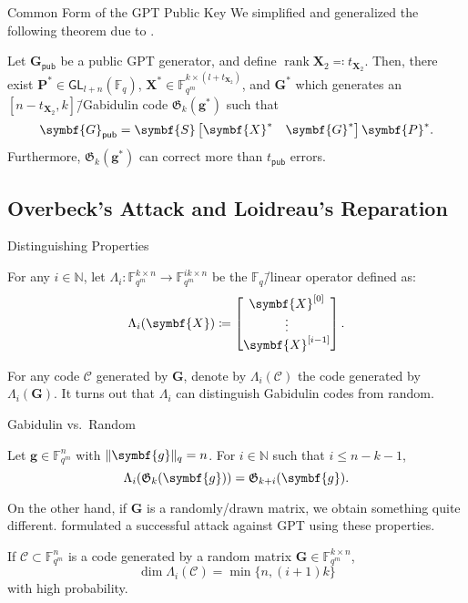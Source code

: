 \documentclass[usepdftitle=false]{beamer}
\renewcommand*{\vec}{\symbf}%
\newcommand*{\mat}{\symbf}%
\DeclareMathOperator{\rank}{rank}%
\newcommand*{\GL}{\ensuremath{\mathsf{GL}}}%
\newcommand*{\pub}{\ensuremath{\mathsf{pub}}}%
\newcommand*{\FF}{\ensuremath{\mathbb{F}}}%
\newcommand*{\NN}{\ensuremath{\mathbb{N}}}%
\newcommand*{\Gab}{\ensuremath{\mathfrak{G}}}%
\DeclarePairedDelimiter{\norm}{\lVert}{\rVert}%
\newcommand*{\normR}[2]{\ensuremath{\norm{#1}_{#2}}}%
\begin{document}
\begin{frame}{Common Form of the GPT Public Key}
  We simplified and generalized the following theorem due to
  \textcite{Ksh07}.
  \begin{theorem}
    Let \(\mat{G}_{\pub}\) be a public GPT generator, and define
    \(\rank\mat{X}_2 \eqqcolon t_{\mat{X}_2}\).  Then, there exist
    \(\mat{P}^* \in \GL_{l + n}(\FF_q)\),
    \(\mat{X}^* \in \FF_{q^m}^{k \times (l + t_{\mat{X}_2})}\), and
    \(\mat{G}^*\) which generates an
    \([n - t_{\mat{X}_2}, k]\)\=/Gabidulin code \(\Gab_k(\vec{g}^*)\)
    such that
    \[
      \mat{G}_{\pub} =
      \mat{S}
      \begin{bmatrix} \mat{X}^* & \mat{G}^* \end{bmatrix}
      \mat{P}^*\text.
    \]
    Furthermore, \(\Gab_k(\vec{g}^*)\) can correct more than
    \(t_{\pub}\) errors.
  \end{theorem}
\end{frame}

\subsection{Overbeck's Attack and Loidreau's Reparation}

\begin{frame}{Distinguishing Properties}
  \begin{definition}
    For any \(i \in \NN\), let
    \(\Lambda_i\colon \FF_{q^m}^{k \times n} \to \FF_{q^m}^{i k \times
      n}\) be the \(\FF_q\)\=/linear operator defined as:
    \[
      \Lambda_i(\mat{X}) \coloneqq
      \begin{bmatrix}
        \mat{X}^{[0]} \\
        \vdots \\ \mat{X}^{[i - 1]}
      \end{bmatrix}\text.
    \]
  \end{definition}
  For any code \(\mathcal{C}\) generated by \(\mat{G}\), denote by
  \(\Lambda_i(\mathcal{C})\) the code generated by
  \(\Lambda_i(\mat{G})\).  \alert{It turns out that \(\Lambda_i\) can
    distinguish Gabidulin codes from random}.
\end{frame}

\begin{frame}{Gabidulin vs.\ Random}
  \begin{lemma}
    Let \(\vec{g} \in \FF_{q^m}^n\) with \(\normR{\vec{g}}{q} = n\).
    For \(i \in \NN\) such that \(i \le n - k - 1\),
    \[
      \Lambda_i(\Gab_k(\vec{g})) = \Gab_{k + i}(\vec{g})\text.
    \]
  \end{lemma}
  On the other hand, if \(\mat{G}\) is a randomly\-/drawn matrix, we
  obtain something quite different.  \Textcite{Ove05} formulated a
  successful attack against GPT using these properties.
  \begin{lemma}
    If \(\mathcal{C} \subset \FF_{q^m}^n\) is a code generated by a
    random matrix \(\mat{G} \in \FF_{q^m}^{k \times n}\),
    \[
      \dim\Lambda_i(\mathcal{C}) = \min\{n, (i + 1) k\}
    \]
    with high probability.
  \end{lemma}
\end{frame}
\end{document}
